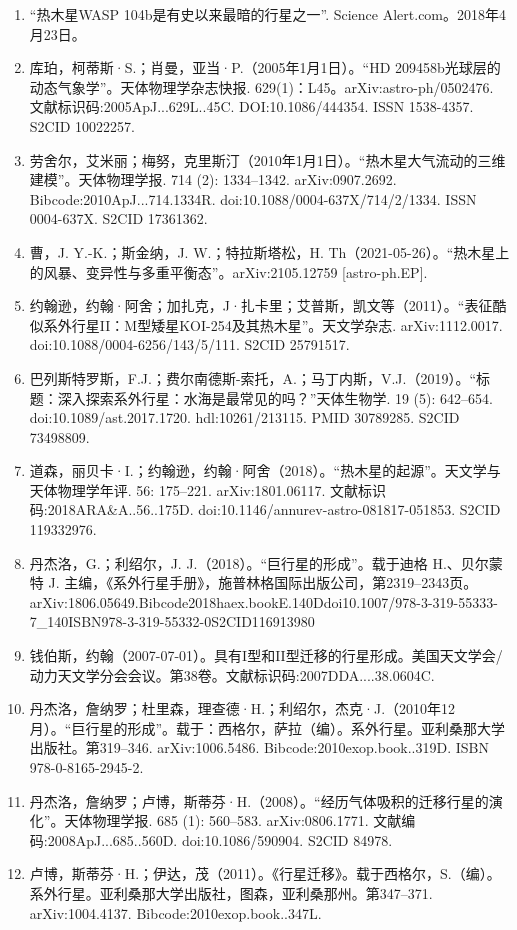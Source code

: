 \begin{enumerate}
\item “热木星WASP 104b是有史以来最暗的行星之一”. Science Alert.com。2018年4月23日。
\item 库珀，柯蒂斯·S.；肖曼，亚当·P.（2005年1月1日）。“HD 209458b光球层的动态气象学”。天体物理学杂志快报. 629(1)：L45。arXiv:astro-ph/0502476. 文献标识码:2005ApJ...629L..45C. DOI:10.1086/444354. ISSN 1538-4357. S2CID 10022257.
\item 劳舍尔，艾米丽；梅努，克里斯汀（2010年1月1日）。“热木星大气流动的三维建模”。天体物理学报. 714 (2): 1334–1342. arXiv:0907.2692. Bibcode:2010ApJ...714.1334R. doi:10.1088/0004-637X/714/2/1334. ISSN 0004-637X. S2CID 17361362.
\item 曹，J. Y.-K.；斯金纳，J. W.；特拉斯塔松，H. Th（2021-05-26）。“热木星上的风暴、变异性与多重平衡态”。arXiv:2105.12759 [astro-ph.EP].
\item 约翰逊，约翰·阿舍；加扎克，J·扎卡里；艾普斯，凯文等（2011）。“表征酷似系外行星II：M型矮星KOI-254及其热木星”。天文学杂志. arXiv:1112.0017. doi:10.1088/0004-6256/143/5/111. S2CID 25791517.
\item 巴列斯特罗斯，F.J.；费尔南德斯-索托，A.；马丁内斯，V.J.（2019）。“标题：深入探索系外行星：水海是最常见的吗？”天体生物学. 19 (5): 642–654. doi:10.1089/ast.2017.1720. hdl:10261/213115. PMID 30789285. S2CID 73498809.
\item 道森，丽贝卡·I.；约翰逊，约翰·阿舍（2018）。“热木星的起源”。天文学与天体物理学年评. 56: 175–221. arXiv:1801.06117. 文献标识码:2018ARA&A..56..175D. doi:10.1146/annurev-astro-081817-051853. S2CID 119332976.
\item 丹杰洛，G.；利绍尔，J. J.（2018）。“巨行星的形成”。载于迪格 H.、贝尔蒙特 J. 主编，《系外行星手册》，施普林格国际出版公司，第2319–2343页。arXiv:1806.05649.Bibcode2018haex.bookE.140Ddoi10.1007/978-3-319-55333-7_140ISBN978-3-319-55332-0S2CID116913980
\item 钱伯斯，约翰（2007-07-01）。具有I型和II型迁移的行星形成。美国天文学会/动力天文学分会会议。第38卷。文献标识码:2007DDA....38.0604C.
\item 丹杰洛，詹纳罗；杜里森，理查德·H.；利绍尔，杰克·J.（2010年12月）。“巨行星的形成”。载于：西格尔，萨拉（编）。系外行星。亚利桑那大学出版社。第319–346. arXiv:1006.5486. Bibcode:2010exop.book..319D. ISBN 978-0-8165-2945-2.
\item 丹杰洛，詹纳罗；卢博，斯蒂芬·H.（2008）。“经历气体吸积的迁移行星的演化”。天体物理学报. 685 (1): 560–583. arXiv:0806.1771. 文献编码:2008ApJ...685..560D. doi:10.1086/590904. S2CID 84978.
\item 卢博，斯蒂芬·H.；伊达，茂（2011）。《行星迁移》。载于西格尔，S.（编）。系外行星。亚利桑那大学出版社，图森，亚利桑那州。第347–371. arXiv:1004.4137. Bibcode:2010exop.book..347L.

\end{enumerate}
